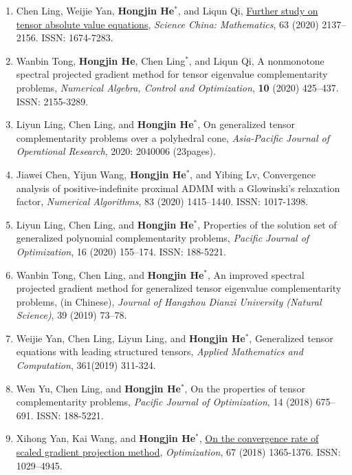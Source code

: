 \begin{enumerate}
\item Chen Ling, Weijie Yan, {\bf\color{black}Hongjin He}$^*$, and Liqun Qi, \href{https://doi.org/10.1007/s11425-018-9560-3}{\color{blue}Further study on tensor absolute value equations}, {\it Science China: Mathematics}, 63 (2020) 2137--2156. ISSN: 1674-7283.

\item Wanbin Tong, {\bf\color{black}Hongjin He}, Chen Ling$^*$, and Liqun Qi, A nonmonotone spectral projected gradient method for tensor eigenvalue complementarity problems, {\it Numerical Algebra, Control and Optimization}, \textbf{10} (2020) 425--437. ISSN: 2155-3289.

\item Liyun Ling, Chen Ling, and {\bf\color{black}Hongjin He}$^*$, On generalized tensor complementarity problems over a polyhedral cone, {\it Asia-Pacific Journal of Operational Research}, 2020: 2040006 (23pages).

\item Jiawei Chen, Yijun Wang, {\bf\color{black}Hongjin He}$^*$, and Yibing Lv, {\color{blue}Convergence analysis of positive-indefinite proximal ADMM with a Glowinski's relaxation factor}, {\it Numerical
	Algorithms}, 83 (2020) 1415--1440. ISSN: 1017-1398.

\item Liyun Ling, Chen Ling, and {\bf\color{black}Hongjin He}$^*$, Properties of the
solution set of generalized polynomial complementarity problems, {\it Pacific Journal of
	Optimization}, 16 (2020) 155--174. ISSN: 188-5221.

\item Wanbin Tong, Chen Ling, and  {\bf\color{black}Hongjin He}$^*$, An improved spectral projected gradient method for generalized tensor eigenvalue complementarity problems,  (in Chinese), {\it Journal of Hangzhou Dianzi University (Natural Science)}, 39 (2019) 73--78.

\item Weijie Yan, Chen Ling, Liyun Ling, and {\bf\color{black}Hongjin He}$^*$, Generalized tensor equations with leading structured tensors, {\it Applied Mathematics and Computation}, 361(2019) 311-324.

\item Wen Yu, Chen Ling, and {\bf\color{black}Hongjin He}$^*$, On the properties of tensor
complementarity problems, {\it Pacific Journal of Optimization}, 14 (2018) 675--691.
ISSN: 188-5221.

\item Xihong Yan, Kai Wang, and {\bf\color{black}Hongjin He}$^*$,
\href{https://doi.org/10.1080/02331934.2018.1455833}{On the convergence rate of scaled
	gradient projection method}, {\it Optimization}, 67 (2018) 1365-1376. ISSN: 1029--4945.


\end{enumerate}
